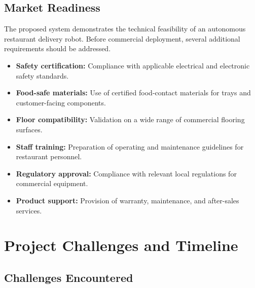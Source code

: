 \documentclass[12pt,a4paper]{article}
\begin{document}
\subsection{Market Readiness}

The proposed system demonstrates the technical feasibility of an
autonomous restaurant delivery robot. Before commercial deployment,
several additional requirements should be addressed.



\begin{itemize}[nosep]
    \item \textbf{Safety certification:} Compliance with applicable electrical and electronic safety standards.

    \item \textbf{Food-safe materials:} Use of certified food-contact materials for trays and customer-facing components.

    \item \textbf{Floor compatibility:} Validation on a wide range of commercial flooring surfaces.

    \item \textbf{Staff training:} Preparation of operating and maintenance guidelines for restaurant personnel.

    \item \textbf{Regulatory approval:} Compliance with relevant local regulations for commercial equipment.

    \item \textbf{Product support:} Provision of warranty, maintenance, and after-sales services.
\end{itemize}

\section{Project Challenges and Timeline}
\label{sec:challenges}

\subsection{Challenges Encountered}
\end{document}
